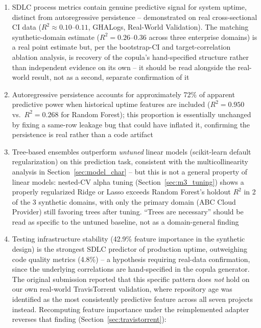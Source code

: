 \documentclass[technologies,article,submit,pdftex,moreauthors]{Definitions/mdpi}
\begin{document}
\begin{enumerate}
\def\labelenumi{\arabic{enumi}.}
\item
  SDLC process metrics contain genuine predictive signal for system
  uptime, distinct from autoregressive persistence -- demonstrated on
  real cross-sectional CI data (\(R^2 \approx 0.10\)--\(0.11\), GHALogs,
  Real-World Validation). The matching synthetic-domain estimate
  (\(R^2 = 0.26\)--\(0.36\) across three enterprise domains) is a real
  point estimate but, per the bootstrap-CI and target-correlation
  ablation analysis, is recovery of the copula's hand-specified
  structure rather than independent evidence on its own -- it should be
  read alongside the real-world result, not as a second, separate
  confirmation of it
\item
  Autoregressive persistence accounts for approximately 72\% of apparent
  predictive power when historical uptime features are included
  (\(R^2 = 0.950\) vs.~\(R^2 = 0.268\) for Random Forest); this
  proportion is essentially unchanged by fixing a same-row leakage bug
  that could have inflated it, confirming the persistence is real rather
  than a code artifact
\item
  Tree-based ensembles outperform \emph{untuned} linear models
  (scikit-learn default regularization) on this prediction task,
  consistent with the multicollinearity analysis in Section~\ref{sec:model_char} -- but
  this is not a general property of linear models: nested-CV alpha
  tuning (Section~\ref{sec:m3_tuning}) shows a properly regularized Ridge or Lasso
  exceeds Random Forest's holdout \(R^2\) in 2 of the 3 synthetic
  domains, with only the primary domain (ABC Cloud Provider) still
  favoring trees after tuning. ``Trees are necessary'' should be read as
  specific to the untuned baseline, not as a domain-general finding
\item
  Testing infrastructure stability (42.9\% feature importance in the
  synthetic design) is the strongest SDLC predictor of production
  uptime, outweighing code quality metrics (4.8\%) -- a hypothesis
  requiring real-data confirmation, since the underlying correlations
  are hand-specified in the copula generator. The original submission
  reported that this specific pattern does \emph{not} hold on our own
  real-world TravisTorrent validation, where repository age was
  identified as the most consistently predictive feature across all
  seven projects instead. Recomputing feature importance under the
  reimplemented adapter reverses that finding (Section~\ref{sec:travistorrent}):

\end{enumerate}
\end{document}
